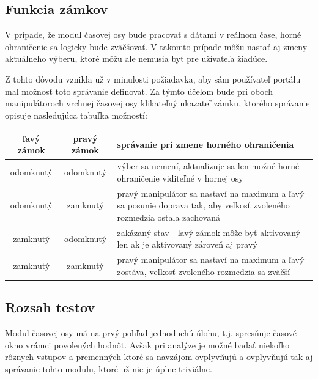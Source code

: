 \documentclass[
  digital, %
  twoside, %
  notable,   %
  nolof,   %
  nolot,   %
]{fithesis3}
\begin{document}
\subsection{Funkcia zámkov}
\label{sec:lockers}
V prípade, že modul časovej osy bude pracovať s dátami v reálnom čase, horné ohraničenie sa logicky bude zväčšovať. V takomto prípade môžu nastať aj zmeny aktuálneho výberu, ktoré môžu ale nemusia byť pre užívateľa žiadúce.

Z tohto dôvodu vznikla už v minulosti požiadavka, aby sám používateľ portálu mal možnosť toto správanie definovať. Za týmto účelom bude pri oboch manipulátoroch vrchnej časovej osy klikateľný ukazateľ zámku, ktorého správanie opisuje nasledujúca tabuľka možností:
\begin{center}
  \begin{tabular}{ | c | c || p{6.5cm} | }
    \hline
    ľavý zámok & pravý zámok & správanie pri zmene horného ohraničenia \\ \hline \hline
    odomknutý & odomknutý & výber sa nemení, aktualizuje sa len možné horné ohraničenie viditeľné v hornej osy \\ \hline
    odomknutý & zamknutý & pravý manipulátor sa nastaví na maximum a ľavý sa posunie doprava tak, aby veľkosť zvoleného rozmedzia ostala zachovaná\\ \hline
    zamknutý & odomknutý & zakázaný stav - ľavý zámok môže byť aktivovaný len ak je aktivovaný zároveň aj pravý \\ \hline
    zamknutý & zamknutý & pravý manipulátor sa nastaví na maximum a ľavý zostáva, veľkosť zvoleného rozmedzia sa zväčší \\ \hline
  \end{tabular}
\end{center}

\subsection{Rozsah testov}
\label{sec:tests}
Modul časovej osy má na prvý pohľad jednoduchú úlohu, t.j. spresňuje časové okno vrámci povolených hodnôt. Avšak pri analýze je možné badať niekoľko rôznych vstupov a premenných ktoré sa navzájom ovplyvňujú a ovplyvňujú tak aj správanie tohto modulu, ktoré už nie je úplne triviálne.
\end{document}

